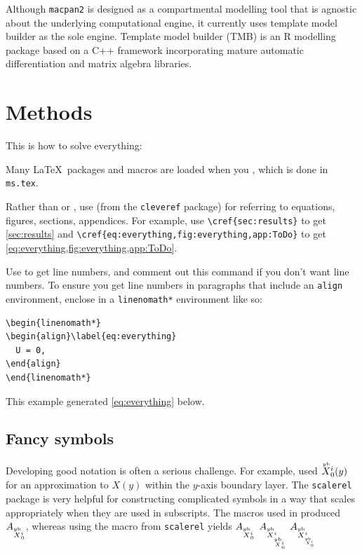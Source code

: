 \documentclass[12pt]{article}\usepackage[]{graphicx}\usepackage[]{xcolor}
\begin{document}
Although \texttt{macpan2} is designed as a compartmental modelling tool that is agnostic about the underlying computational engine, it currently uses template model builder as the sole engine. Template model builder (TMB) is an R modelling package based on a C++ framework incorporating mature automatic differentiation and matrix algebra libraries.

\section{Methods}\label{sec:methods}

This is how to solve everything:

Many \LaTeX\ packages and macros are loaded when you
\verb||, which is done in \texttt{ms.tex}.

Rather than  or , use  (from the
\texttt{cleveref} package) for referring to equations, figures,
sections, appendices.  For example, use \verb|\cref{sec:results}| to
get \cref{sec:results} and \verb|\cref{eq:everything,fig:everything,app:ToDo}|
to get \cref{eq:everything,fig:everything,app:ToDo}.

Use  to get line numbers, and comment out this
command if you don't want line numbers.  To ensure you get line numbers
in paragraphs that include an \texttt{align} environment, enclose in a
\verb|linenomath*| environment like so:
\begin{verbatim}
\begin{linenomath*}
\begin{align}\label{eq:everything}
  U = 0,
\end{align}
\end{linenomath*}
\end{verbatim}
This example generated \cref{eq:everything} below.

\subsection{Fancy symbols}


Developing good notation is often a serious challenge.
For example, \cite{ParsEarn24} used $\overset{\textrm{\tiny\upshape $y$b}}X{}_{0}^{i}(y)$ for
an approximation to $X(y)$ within the $y$-axis
boundary layer.  The \texttt{scalerel} package is very helpful
for constructing complicated symbols in a way that scales
appropriately
when they are used in subscripts.   The macros used
in \cite{ParsEarn24} produced $A_{\overset{\textrm{\tiny\upshape $y$b}}X{}_{0}^{i}}$, whereas
using the  macro from \texttt{scalerel} yields
$A_{\overset{\textrm{\tiny\upshape $y$b}}X{}_{0}^{i}}$ $A_{\overset{\textrm{\tiny\upshape $y$b}}X{}_{\overset{\textrm{\tiny\upshape $y$b}}X{}_{0}^{i}}^{i}}$
$A_{\Xybfancy{\scaleobj{0.8}{\Xybfancy{0}{i}}}{i}}$
\end{document}
